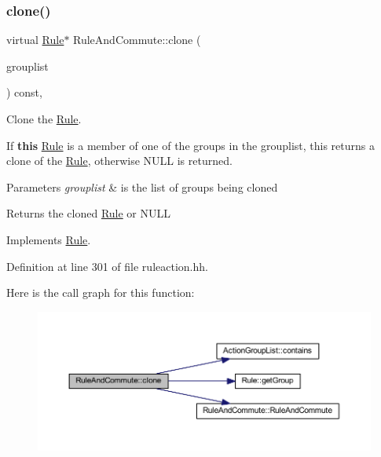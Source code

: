 \subsubsection{\texorpdfstring{clone()}{clone()}}
{\footnotesize\ttfamily virtual \mbox{\hyperlink{class_rule}{Rule}}$\ast$ Rule\+And\+Commute\+::clone (\begin{DoxyParamCaption}\item[{const \mbox{\hyperlink{class_action_group_list}{Action\+Group\+List}} \&}]{grouplist }\end{DoxyParamCaption}) const\hspace{0.3cm}{\ttfamily [inline]}, {\ttfamily [virtual]}}



Clone the \mbox{\hyperlink{class_rule}{Rule}}. 

If {\bfseries{this}} \mbox{\hyperlink{class_rule}{Rule}} is a member of one of the groups in the grouplist, this returns a clone of the \mbox{\hyperlink{class_rule}{Rule}}, otherwise N\+U\+LL is returned. 
\begin{DoxyParams}{Parameters}
{\em grouplist} & is the list of groups being cloned \\
\hline
\end{DoxyParams}
\begin{DoxyReturn}{Returns}
the cloned \mbox{\hyperlink{class_rule}{Rule}} or N\+U\+LL 
\end{DoxyReturn}


Implements \mbox{\hyperlink{class_rule_a70de90a76461bfa7ea0b575ce3c11e4d}{Rule}}.



Definition at line 301 of file ruleaction.\+hh.

Here is the call graph for this function\+:
\nopagebreak
\begin{figure}[H]
\begin{center}
\leavevmode
\includegraphics[width=350pt]{class_rule_and_commute_a21d46bfc5ca2a55556aa603e28b62497_cgraph}
\end{center}
\end{figure}
\mbox{\label{class_rule_and_commute_abed13b32d01609ce87cba5cc9020a0c8}} 
